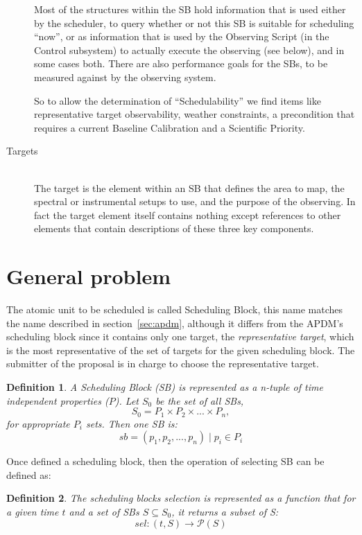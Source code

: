 \begin{description}
Most of the structures within the SB hold information that is used either by the scheduler, to query whether or not this SB is suitable for scheduling ``now'', or as information that is used by the Observing Script (in the Control subsystem) to actually execute the observing (see below), and in some cases both. There are also performance goals for the SBs, to be measured against by the observing system.

So to allow the determination of ``Schedulability'' we find items like representative target observability, weather constraints, a precondition that requires a current Baseline Calibration and a Scientific Priority.

\item[Targets] \hfill \\
The target is the element within an SB that defines the area to map, the spectral or instrumental setups to use, and the purpose of the observing. In fact the target element itself contains nothing except references to other elements that contain descriptions of these three key components.

\end{description}

\section{General problem}
\newtheorem{problem-def}{Definition}
The atomic unit to be scheduled is called Scheduling Block, this name matches the name described in section~\ref{sec:apdm}, although it differs from the APDM's scheduling block since it contains only one target, the \textit{representative target}, which is the most representative of the set of targets for the given scheduling block. The submitter of the proposal is in charge to choose the representative target.


\begin{problem-def}
A Scheduling Block (SB) is represented as a n-tuple of time independent  properties ($P$). Let $S_0$ be the set of all SBs,
$$S_0 = P_1 \times P_2 \times ... \times P_n,$$
for appropriate $P_i$ sets. Then one SB is:
$$sb = (p_1, p_2, ..., p_n) \mid p_i \in P_i$$
\end{problem-def} 

Once defined a scheduling block, then the operation of selecting SB can be defined as:
\begin{problem-def}
The scheduling blocks selection is represented as a function that for a given time $t$ and a set of SBs $S \subseteq S_0$, it returns a subset of S:
$$sel:(t,S) \rightarrow \mathcal P \left({S}\right)$$
\end{problem-def}


